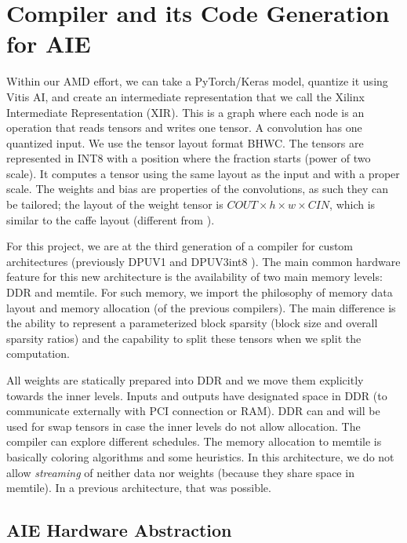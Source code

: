 \documentclass[conference]{IEEEtran}
\begin{document}
\section{Compiler and its Code Generation for AIE}
\label{sec:compiler}
Within our AMD effort, we can take a PyTorch/Keras model, quantize it
using Vitis AI, and create an intermediate representation that we call
the Xilinx Intermediate Representation (XIR). This is a graph where
each node is an operation that reads tensors and writes one tensor. A
convolution has one quantized input.  We use the tensor layout format
BHWC. The tensors are represented in INT8 with a position where the
fraction starts (power of two scale). It computes a tensor using the
same layout as the input and with a proper scale. The weights and bias
are properties of the convolutions, as such they can be tailored; the
layout of the weight tensor is $COUT\times h \times w \times CIN$,
which is similar to the caffe layout \cite{Caffe} (different from
\cite{tensorflow}).

For this project, we are at the third generation of a compiler for
custom architectures (previously DPUV1 and DPUV3int8
\cite{10.1145/3473334,abs-2110-04327}). The main common hardware
feature for this new architecture is the availability of two main
memory levels: DDR and memtile. For such memory, we import the
philosophy of memory data layout and memory allocation (of the
previous compilers). The main difference is the ability to represent a
parameterized block sparsity (block size and overall sparsity ratios)
and the capability to split these tensors when we split the
computation.

All weights are statically prepared into DDR and we move them
explicitly towards the inner levels. Inputs and outputs have
designated space in DDR (to communicate externally with PCI connection
or RAM). DDR can and will be used for swap tensors in case the inner
levels do not allow allocation.  The compiler can explore different
schedules. The memory allocation to memtile is basically coloring
algorithms and some heuristics. In this architecture, we do not allow
{\em streaming} of neither data nor weights (because they share space
in memtile). In a previous architecture, that was possible.

\subsection{AIE Hardware Abstraction}
\label{sec:aie2}
\end{document}
